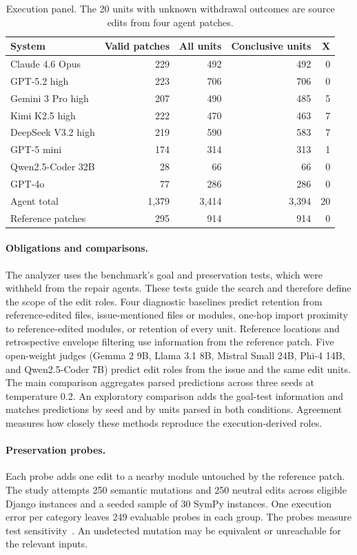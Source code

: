 \documentclass[a4paper,fleqn]{cas-sc}
\newcommand{\lab}[1]{\textsf{#1}}
\begin{document}
\begin{table}[pos=htbp]
\caption{Execution panel. The 20 units with unknown withdrawal outcomes are source edits from four agent patches.}
\label{tab:panel}
\centering\small
\begin{tabular}{lrrrr}
\toprule
System & Valid patches & All units & Conclusive units & \lab{X} \\
\midrule
Claude 4.6 Opus & 229 & 492 & 492 & 0 \\
GPT-5.2 high & 223 & 706 & 706 & 0 \\
Gemini 3 Pro high & 207 & 490 & 485 & 5 \\
Kimi K2.5 high & 222 & 470 & 463 & 7 \\
DeepSeek V3.2 high & 219 & 590 & 583 & 7 \\
GPT-5 mini & 174 & 314 & 313 & 1 \\
Qwen2.5-Coder 32B & 28 & 66 & 66 & 0 \\
GPT-4o & 77 & 286 & 286 & 0 \\
\midrule
Agent total & 1,379 & 3,414 & 3,394 & 20 \\
Reference patches & 295 & 914 & 914 & 0 \\
\bottomrule
\end{tabular}
\end{table}

\paragraph{Obligations and comparisons.} The analyzer uses the benchmark's goal and preservation tests, which were withheld from the repair agents. These tests guide the search and therefore define the scope of the edit roles. Four diagnostic baselines predict retention from reference-edited files, issue-mentioned files or modules, one-hop import proximity to reference-edited modules, or retention of every unit. Reference locations and retrospective envelope filtering use information from the reference patch. Five open-weight judges (Gemma 2 9B, Llama 3.1 8B, Mistral Small 24B, Phi-4 14B, and Qwen2.5-Coder 7B) predict edit roles from the issue and the same edit units. The main comparison aggregates parsed predictions across three seeds at temperature 0.2. An exploratory comparison adds the goal-test information and matches predictions by seed and by units parsed in both conditions. Agreement measures how closely these methods reproduce the execution-derived roles.

\paragraph{Preservation probes.} Each probe adds one edit to a nearby module untouched by the reference patch. The study attempts 250 semantic mutations and 250 neutral edits across eligible Django instances and a seeded sample of 30 SymPy instances. One execution error per category leaves 249 evaluable probes in each group. The probes measure test sensitivity~\citep{jia2011mutation,just2014mutants}. An undetected mutation may be equivalent or unreachable for the relevant inputs.
\end{document}
